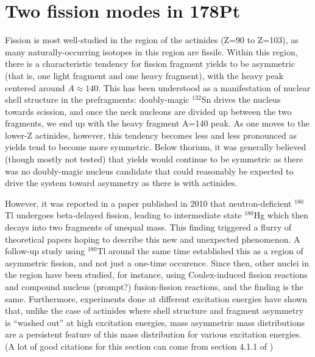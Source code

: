 \chapter{Two fission modes in 178Pt}\label{chap:178Pt}

\maketitle

Fission is most well-studied in the region of the actinides (Z=90 to Z=103), as many naturally-occurring isotopes in this region are fissile. Within this region, there is a characteristic tendency for fission fragment yields to be asymmetric (that is, one light fragment and one heavy fragment), with the heavy peak centered around $A\approx140$. This has been understood as a manifestation of nuclear shell structure in the prefragments: doubly-magic $^{132}$Sn drives the nucleus towards scission, and once the neck nucleons are divided up between the two fragments, we end up with the heavy fragment A=140 peak. As one moves to the lower-Z actinides, however, this tendency becomes less and less pronounced as yields tend to become more symmetric. Below thorium, it was generally believed (though mostly not tested) that yields would continue to be symmetric as there was no doubly-magic nucleus candidate that could reasonably be expected to drive the system toward asymmetry as there is with actinides.

However, it was reported in a paper published in 2010 \cite{Andreyev2010} that neutron-deficient $^{180}$Tl undergoes beta-delayed fission, leading to intermediate state $^{180}$Hg which then decays into two fragments of unequal mass. This finding triggered a flurry of theoretical papers hoping to describe this new and unexpected phenomenon. A follow-up study using $^{180}$Tl \cite{Liberati2013} around the same time established this as a region of asymmetric fission, and not just a one-time occurence. Since then, other nuclei in the region have been studied, for instance, using Coulex-induced fission reactions and compound nucleus (prompt?) fusion-fission reactions, and the finding is the same. Furthermore, experiments done at different excitation energies have shown that, unlike the case of actinides where shell structure and fragment asymmetry is ``washed out'' at high excitation energies, mass asymmetric mass distributions are a persistent feature of this mass distribution for various excitation energies. (A lot of good citations for this section can come from section 4.1.1 of \cite{Andreyev2018})

